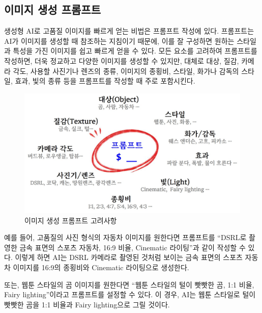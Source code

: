 \documentclass[
  letterpaper,
]{book}
\begin{document}
\hypertarget{uxc774uxbbf8uxc9c0-uxc0dduxc131-uxd504uxb86cuxd504uxd2b8}{%
\subsection{이미지 생성
프롬프트}\label{uxc774uxbbf8uxc9c0-uxc0dduxc131-uxd504uxb86cuxd504uxd2b8}}

생성형 AI로 고품질 이미지를 빠르게 얻는 비법은 프롬프트 작성에 있다.
프롬프트는 AI가 이미지를 생성할 때 참조하는 지침이기 때문에, 이를 잘
구성하면 원하는 스타일과 특성을 가진 이미지를 쉽고 빠르게 얻을 수 있다.
모든 요소를 고려하여 프롬프트를 작성하면, 더욱 정교하고 다양한 이미지를
생성할 수 있지만, 대체로 대상, 질감, 카메라 각도, 사용할 사진기나 렌즈의
종류, 이미지의 종횡비, 스타일, 화가나 감독의 스타일, 효과, 빛의 종류
등을 프롬프트를 작성할 때 주로 포함시킨다.

\begin{figure}

{\centering \includegraphics{images/image_prompt_overview.jpg}

}

\caption{이미지 생성 프롬프트 고려사항}

\end{figure}

예를 들어, 고품질의 사진 형식의 자동차 이미지를 원한다면 프롬프트를
``DSRL로 촬영한 금속 표면의 스포츠 자동차, 16:9 비율, Cinematic
라이팅''과 같이 작성할 수 있다. 이렇게 하면 AI는 DSRL 카메라로 촬영된
것처럼 보이는 금속 표면의 스포츠 자동차 이미지를 16:9의 종횡비와
Cinematic 라이팅으로 생성한다.

또는, 웹툰 스타일의 곰 이미지를 원한다면 ``웹툰 스타일의 털이 빳빳한 곰,
1:1 비율, Fairy lighting''이라고 프롬프트를 설정할 수 있다. 이 경우,
AI는 웹툰 스타일로 털이 빳빳한 곰을 1:1 비율과 Fairy lighting으로 그릴
것이다.
\end{document}
